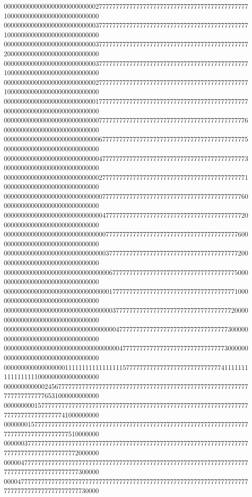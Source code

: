 \documentclass[letterpaper,10pt,english]{sphinxmanual}
\begin{document}
\begin{sphinxVerbatim}[commandchars=\\\{\},numbers=left,firstnumber=1,stepnumber=1]
0000000000000000000000000002777777777777777777777777777777777777777777771000000000000000000000000000
0000000000000000000000000003777777777777777777777777777777777777777777771000000000000000000000000000
0000000000000000000000000003777777777777777777777777777777777777777777772000000000000000000000000000
0000000000000000000000000003777777777777777777777777777777777777777777771000000000000000000000000000
0000000000000000000000000002777777777777777777777777777777777777777777771000000000000000000000000000
0000000000000000000000000001777777777777777777777777777777777777777777770000000000000000000000000000
0000000000000000000000000000777777777777777777777777777777777777777777760000000000000000000000000000
0000000000000000000000000000677777777777777777777777777777777777777777750000000000000000000000000000
0000000000000000000000000000477777777777777777777777777777777777777777730000000000000000000000000000
0000000000000000000000000000277777777777777777777777777777777777777777710000000000000000000000000000
0000000000000000000000000000077777777777777777777777777777777777777777600000000000000000000000000000
0000000000000000000000000000047777777777777777777777777777777777777777200000000000000000000000000000
0000000000000000000000000000007777777777777777777777777777777777777776000000000000000000000000000000
0000000000000000000000000000003777777777777777777777777777777777777772000000000000000000000000000000
0000000000000000000000000000000677777777777777777777777777777777777750000000000000000000000000000000
0000000000000000000000000000000177777777777777777777777777777777777710000000000000000000000000000000
0000000000000000000000000000000037777777777777777777777777777777777200000000000000000000000000000000
0000000000000000000000000000000004777777777777777777777777777777773000000000000000000000000000000000
0000000000000000000000000000000000477777777777777777777777777777730000000000000000000000000000000000
0000000000000000001111111111111111157777777777777777777777777777411111111111111111000000000000000000
0000000000002456777777777777777777777777777777777777777777777777777777777777777777776531000000000000
0000000001577777777777777777777777777777777777777777777777777777777777777777777777777777741000000000
0000000157777777777777777777777777777777777777777777777777777777777777777777777777777777777510000000
0000003777777777777777777777777777777777777777777777777777777777777777777777777777777777777772000000
0000047777777777777777777777777777777777777777777777777777777777777777777777777777777777777777300000
0000477777777777777777777777777777777777777777777777777777777777777777777777777777777777777777730000

\end{sphinxVerbatim}
\end{document}
